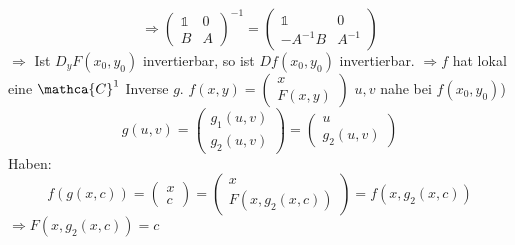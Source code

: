 \documentclass[../ana2.tex]{subfiles}
\begin{document}
\[ \Rightarrow \begin{pmatrix}
    \mathds{1} & 0 \\
    B & A
\end{pmatrix}^{-1} = \begin{pmatrix}
    \mathds{1} & 0 \\
    -A^{-1}B & A^{-1}
\end{pmatrix} \]
\(\Rightarrow\) Ist \(D_yF(x_0, y_0)\) invertierbar, 
so ist \( Df (x_0, y_0) \) invertierbar.
\(\Rightarrow f\) hat lokal eine \(\mathca{C}^1\) Inverse \(g\).
\(f(x,y) =\begin{pmatrix}
    x \\
    F(x,y)
\end{pmatrix}\)
\(u,v\) nahe bei \(f(x_0,y_0)\))\\
\[ g(u,v) = \begin{pmatrix}
    g_1(u,v) \\ g_2(u,v)
\end{pmatrix} = \begin{pmatrix}
    u \\
    g_2(u,v)
\end{pmatrix} \]
Haben: 
\[f(g(x,c)) = \begin{pmatrix}
    x \\
    c
\end{pmatrix} = \begin{pmatrix}
    x \\
    F(x, g_2(x, c))
\end{pmatrix} = f(x,g_2(x,c)) \]
\( \Rightarrow F(x,g_2(x,c)) = c \)
\end{document}
